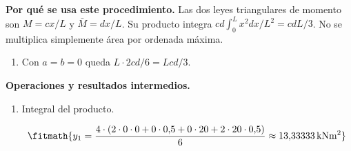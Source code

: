 \noindent\textbf{Por qué se usa este procedimiento.} Las dos leyes triangulares de momento son $M=cx/L$ y $\bar M=dx/L$. Su producto integra $cd\int_0^Lx^2dx/L^2=cdL/3$. No se multiplica simplemente área por ordenada máxima.

\begin{enumerate}

\item Con $a = b = 0$ queda $L \cdot 2 c d/6 = L c d/3$.

\end{enumerate}

\noindent\textbf{Operaciones y resultados intermedios.}

\begin{enumerate}

\item Integral del producto.

\[\fitmath{y_{1}=\frac{4\cdot \left(2\cdot 0\cdot 0+0\cdot 0{,}5+0\cdot 20+2\cdot 20\cdot 0{,}5\right)}{6}\approx 13{,}33333\,\mathrm{kN m^{2}}}\]

\end{enumerate}
